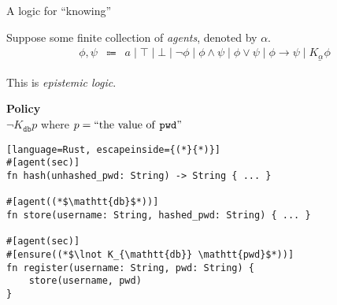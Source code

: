\documentclass[14pt, aspectratio=169, xcolor={dvipsnames}]{beamer}
\begin{document}
\begin{frame}[b]{A logic for ``knowing''}

  Suppose some finite collection of \emph{agents}, denoted by $\alpha$.
  \[\begin{array}{rcl}
    \phi, \psi & \Coloneqq &
      a \mid \top \mid \bot \mid \lnot \phi \mid \phi \land \psi \mid \phi \lor \psi \mid \phi \to \psi
        \mid \underline{K_\alpha \phi}
  \end{array}\]

  \pause
  This is \emph{epistemic logic}.
  \pause

  \vspace{1.5em}
  \begin{center}
    \textbf{Policy} \\
    $\lnot K_{\mathtt{db}} p$
      {\color{black!80}\small where $p = \text{``the value of \texttt{pwd}''}$}
  \end{center}
\end{frame}

\begin{frame}[fragile, c]
  \begin{lstlisting}[language=Rust, escapeinside={(*}{*)}]
#[agent(sec)]
fn hash(unhashed_pwd: String) -> String { ... }

#[agent((*$\mathtt{db}$*))]
fn store(username: String, hashed_pwd: String) { ... }

#[agent(sec)]
#[ensure((*$\lnot K_{\mathtt{db}} \mathtt{pwd}$*))]
fn register(username: String, pwd: String) {
    store(username, pwd)
}
  \end{lstlisting}
\end{frame}
\end{document}
